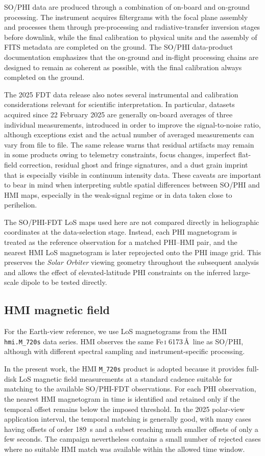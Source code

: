 \documentclass[namedreferences,hyperref,optionalrh]{spr-sola}
\begin{document}
SO/PHI data are produced through a combination of on-board and on-ground processing. The instrument acquires filtergrams with the focal plane assembly and processes them through pre-processing and radiative-transfer inversion stages before downlink, while the final calibration to physical units and the assembly of FITS metadata are completed on the ground. The SO/PHI data-product documentation emphasizes that the on-ground and in-flight processing chains are designed to remain as coherent as possible, with the final calibration always completed on the ground. 

The 2025 FDT data release also notes several instrumental and calibration considerations relevant for scientific interpretation. In particular, datasets acquired since 22 February 2025 are generally on-board averages of three individual measurements, introduced in order to improve the signal-to-noise ratio, although exceptions exist and the actual number of averaged measurements can vary from file to file. The same release warns that residual artifacts may remain in some products owing to telemetry constraints, focus changes, imperfect flat-field correction, residual ghost and fringe signatures, and a dust grain imprint that is especially visible in continuum intensity data. These caveats are important to bear in mind when interpreting subtle spatial differences between SO/PHI and HMI maps, especially in the weak-signal regime or in data taken close to perihelion. 

The SO/PHI-FDT LoS maps used here are not compared directly in heliographic coordinates at the data-selection stage. Instead, each PHI magnetogram is treated as the reference observation for a matched PHI--HMI pair, and the nearest HMI LoS magnetogram is later reprojected onto the PHI image grid. This preserves the \textit{Solar Orbiter} viewing geometry throughout the subsequent analysis and allows the effect of elevated-latitude PHI constraints on the inferred large-scale dipole to be tested directly.

\subsection{HMI magnetic field}

For the Earth-view reference, we use LoS magnetograms from the HMI \texttt{hmi.M\_720s} data series. HMI observes the same Fe\,\textsc{i} 6173\,\AA\ line as SO/PHI, although with different spectral sampling and instrument-specific processing. 

In the present work, the HMI \texttt{M\_720s} product is adopted because it provides full-disk LoS magnetic field measurements at a standard cadence suitable for matching to the available SO/PHI-FDT observations. For each PHI observation, the nearest HMI magnetogram in time is identified and retained only if the temporal offset remains below the imposed threshold. In the 2025 polar-view application interval, the temporal matching is generally good, with many cases having offsets of order 189~s and a subset reaching much smaller offsets of only a few seconds. The campaign nevertheless contains a small number of rejected cases where no suitable HMI match was available within the allowed time window. 
\end{document}
